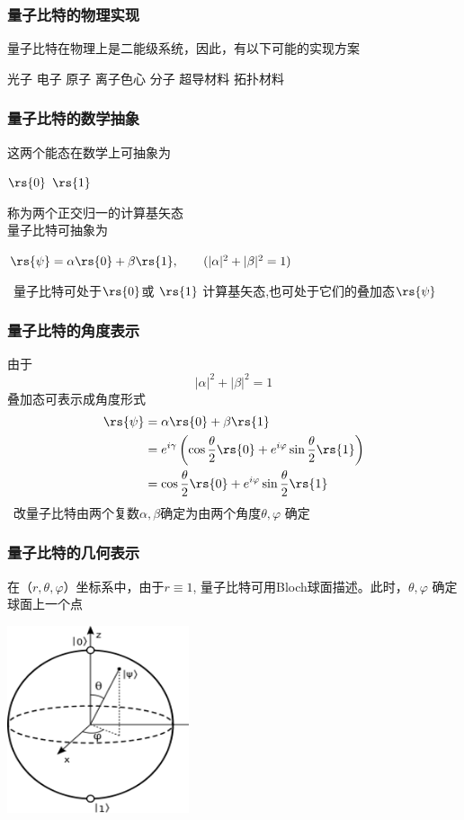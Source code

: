 \begin{frame} 
    \frametitle{量子比特的物理实现}
    量子比特在物理上是二能级系统，因此，有以下可能的实现方案\\
    \begin{enumerate}
        \Item   光子
        \Item   电子
        \Item   原子
        \Item   离子色心
        \Item   分子
        \Item   超导材料
        \Item   拓扑材料
    \end{enumerate}
\end{frame}

\begin{frame} 
    \frametitle{量子比特的数学抽象}   
    这两个能态在数学上可抽象为
    \begin{enumerate}
        \Item   $\rs{0}$
        \Item   $\rs{1}$
    \end{enumerate}
    称为两个正交归一的计算基矢态\\
    量子比特可抽象为
    \begin{enumerate}
        \Item   $\rs{\psi} =\alpha\rs{0}+\beta\rs{1}, \qquad (|\alpha|^2+|\beta|^2=1)$
    \end{enumerate}
    \Note~量子比特可处于$\rs{0}$或 $\rs{1}$ 计算基矢态,也可处于它们的叠加态$\rs{\psi}$
\end{frame}

\begin{frame} 
    \frametitle{量子比特的角度表示} 
  由于\[|\alpha|^2+|\beta|^2=1\]
  叠加态可表示成角度形式  
  \[\begin{aligned}
    \rs{\psi} &=\alpha\rs{0}+\beta\rs{1} \\
    &=e^{i\gamma} \left(\cos\frac{\theta}{2}\rs{0}+e^{i\varphi} \sin\frac{\theta}{2}\rs{1}\right) \\
    &=\cos\frac{\theta}{2}\rs{0}+e^{i\varphi} \sin\frac{\theta}{2}\rs{1}
  \end{aligned}\]
  \Note~改量子比特由两个复数$\alpha,\beta$确定为由两个角度$\theta, \varphi$ 确定
\end{frame}

\begin{frame} 
    \frametitle{量子比特的几何表示} 
  在（$r,\theta,\varphi$）坐标系中，由于$r\equiv 1$, 量子比特可用Bloch球面描述。此时，$\theta, \varphi$ 确定球面上一个点
  \begin{center}
    \includegraphics[width=0.4\textwidth]{figs/8.png}
\end{center} 
\end{frame}

